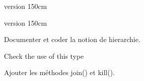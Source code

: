 
\begin{DoxyRefList}
\item[\label{todo__todo000002}%
\Hypertarget{todo__todo000002}%
Member \hyperlink{classIrSensor_ade39a20d2ec88e9ad4686e062093c91d}{Ir\+Sensor\+:\+:gp2\+Convert} (int type, int value)]version 150cm 

version 150cm  
\item[\label{todo__todo000004}%
\Hypertarget{todo__todo000004}%
Class \hyperlink{classlogs_1_1LoggerFactory}{logs\+:\+:Logger\+Factory} ]Documenter et coder la notion de hierarchie.  
\item[\label{todo__todo000001}%
\Hypertarget{todo__todo000001}%
Member \hyperlink{classutils_1_1PointerList_a8d7b485e236a01cc14b41694ae0b3456}{utils\+:\+:Pointer\+List$<$ \+\_\+\+Tp, \+\_\+\+Alloc $>$\+:\+:size\+\_\+type} ]Check the use of this type  
\item[\label{todo__todo000006}%
\Hypertarget{todo__todo000006}%
Class \hyperlink{classutils_1_1Thread}{utils\+:\+:Thread} ]Ajouter les méthodes join() et kill(). 
\end{DoxyRefList}
